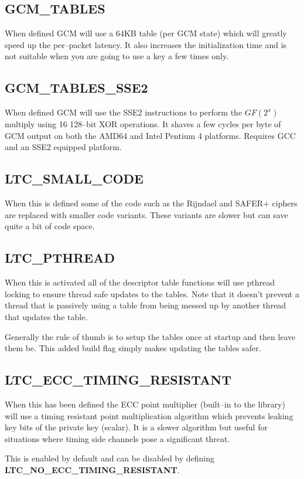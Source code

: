 \documentclass[synpaper]{book}
\begin{document}
\subsection{GCM\_TABLES}
When defined GCM will use a 64KB table (per GCM state) which will greatly speed up the per--packet latency.
It also increases the initialization time and is not suitable when you are going to use a key a few times only.

\subsection{GCM\_TABLES\_SSE2}
When defined GCM will use the SSE2 instructions to perform the $GF(2^x)$ multiply using 16 128--bit XOR operations.  It shaves a few cycles per byte
of GCM output on both the AMD64 and Intel Pentium 4 platforms.  Requires GCC and an SSE2 equipped platform.

\subsection{LTC\_SMALL\_CODE}
When this is defined some of the code such as the Rijndael and SAFER+ ciphers are replaced with smaller code variants.
These variants are slower but can save quite a bit of code space.

\subsection{LTC\_PTHREAD}
When this is activated all of the descriptor table functions will use pthread locking to ensure thread safe updates to the tables.  Note that
it doesn't prevent a thread that is passively using a table from being messed up by another thread that updates the table.

Generally the rule of thumb is to setup the tables once at startup and then leave them be.  This added build flag simply makes updating
the tables safer.

\subsection{LTC\_ECC\_TIMING\_RESISTANT}
When this has been defined the ECC point multiplier (built--in to the library) will use a timing resistant point multiplication
algorithm which prevents leaking key bits of the private key (scalar).  It is a slower algorithm but useful for situations
where timing side channels pose a significant threat.

This is enabled by default and can be disabled by defining \textbf{LTC\_NO\_ECC\_TIMING\_RESISTANT}.
\end{document}
